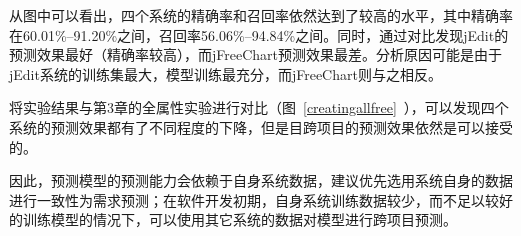 从图中可以看出，四个系统的精确率和召回率依然达到了较高的水平，其中精确率在60.01\%--91.20\%之间，召回率56.06\%--94.84\%之间。同时，通过对比发现jEdit的预测效果最好（精确率较高），而jFreeChart预测效果最差。分析原因可能是由于jEdit系统的训练集最大，模型训练最充分，而jFreeChart则与之相反。

将实验结果与第3章的全属性实验进行对比（图~\ref{creatingallfree}~），可以发现四个系统的预测效果都有了不同程度的下降，但是目跨项目的预测效果依然是可以接受的。

因此，预测模型的预测能力会依赖于自身系统数据，建议优先选用系统自身的数据进行一致性为需求预测；在软件开发初期，自身系统训练数据较少，而不足以较好的训练模型的情况下，可以使用其它系统的数据对模型进行跨项目预测。



